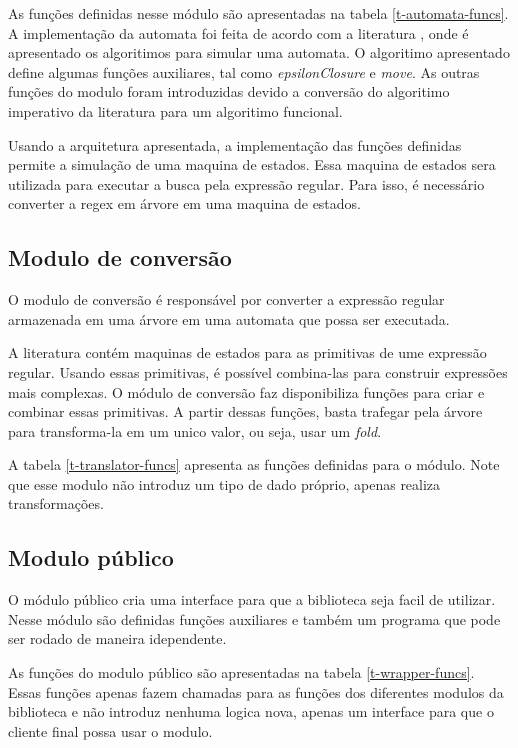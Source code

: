 As funções definidas nesse módulo são apresentadas na tabela \ref{t-automata-funcs}.
A implementação da automata foi feita de acordo com a literatura \cite{dragon-book}, onde é apresentado os algoritimos para simular uma automata.
O algoritimo apresentado define algumas funções auxiliares, tal como \emph{epsilonClosure} e \emph{move}.
As outras funções do modulo foram introduzidas devido a conversão do algoritimo imperativo da literatura para um algoritimo funcional.

Usando a arquitetura apresentada, a implementação das funções definidas permite a simulação de uma maquina de estados.
Essa maquina de estados sera utilizada para executar a busca pela expressão regular.
Para isso, é necessário converter a regex em árvore em uma maquina de estados.

\subsection{Modulo de conversão}

O modulo de conversão é responsável por converter a expressão regular armazenada em uma árvore em uma automata que possa ser executada.

A literatura contém maquinas de estados para as primitivas de ume expressão regular.
Usando essas primitivas, é possível combina-las para construir expressões mais complexas.
O módulo de conversão faz disponibiliza funções para criar e combinar essas primitivas.
A partir dessas funções, basta trafegar pela árvore para transforma-la em um unico valor, ou seja, usar um \emph{fold}.

A tabela \ref{t-translator-funcs} apresenta as funções definidas para o módulo.
Note que esse modulo não introduz um tipo de dado próprio, apenas realiza transformações.

\subsection{Modulo público}
O módulo público cria uma interface para que a biblioteca seja facil de utilizar.
Nesse módulo são definidas funções auxiliares e também um programa que pode ser rodado de maneira idependente.

As funções do modulo público são apresentadas na tabela \ref{t-wrapper-funcs}.
Essas funções apenas fazem chamadas para as funções dos diferentes modulos da biblioteca e não introduz nenhuma logica nova, apenas um interface para que o cliente final possa usar o modulo.

